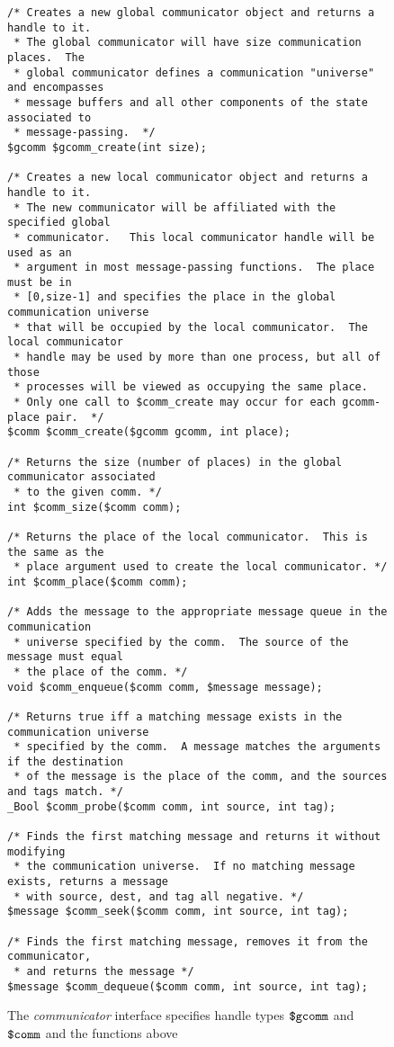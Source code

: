 \begin{figure}
  \begin{small}
\begin{verbatim}
/* Creates a new global communicator object and returns a handle to it.
 * The global communicator will have size communication places.  The
 * global communicator defines a communication "universe" and encompasses
 * message buffers and all other components of the state associated to
 * message-passing.  */
$gcomm $gcomm_create(int size);

/* Creates a new local communicator object and returns a handle to it.
 * The new communicator will be affiliated with the specified global
 * communicator.   This local communicator handle will be used as an
 * argument in most message-passing functions.  The place must be in
 * [0,size-1] and specifies the place in the global communication universe
 * that will be occupied by the local communicator.  The local communicator
 * handle may be used by more than one process, but all of those
 * processes will be viewed as occupying the same place.
 * Only one call to $comm_create may occur for each gcomm-place pair.  */
$comm $comm_create($gcomm gcomm, int place);

/* Returns the size (number of places) in the global communicator associated
 * to the given comm. */
int $comm_size($comm comm);

/* Returns the place of the local communicator.  This is the same as the
 * place argument used to create the local communicator. */
int $comm_place($comm comm);

/* Adds the message to the appropriate message queue in the communication
 * universe specified by the comm.  The source of the message must equal
 * the place of the comm. */
void $comm_enqueue($comm comm, $message message);

/* Returns true iff a matching message exists in the communication universe
 * specified by the comm.  A message matches the arguments if the destination
 * of the message is the place of the comm, and the sources and tags match. */
_Bool $comm_probe($comm comm, int source, int tag);

/* Finds the first matching message and returns it without modifying
 * the communication universe.  If no matching message exists, returns a message
 * with source, dest, and tag all negative. */
$message $comm_seek($comm comm, int source, int tag);

/* Finds the first matching message, removes it from the communicator,
 * and returns the message */ 
$message $comm_dequeue($comm comm, int source, int tag);
\end{verbatim}
  \end{small}
  \caption{The \emph{communicator} interface specifies handle 
    types $\mbox{\texttt{\${}gcomm}}$ and $\mbox{\texttt{\${}comm}}$ and the functions above}
  \label{fig:comm}
\end{figure}

